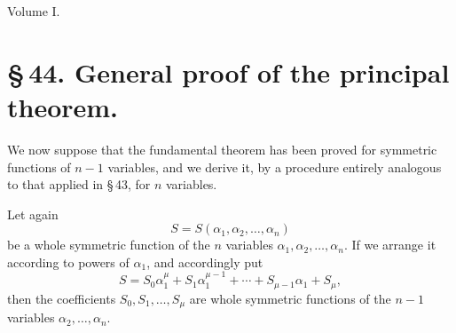 \documentclass[11pt]{article}
\begin{document}
\begin{center}{\large Volume I.}\end{center}

\section*{\S\,44. General proof of the principal theorem.}

We now suppose that the fundamental theorem has been proved for symmetric functions of \(n-1\) variables, and we derive it, by a procedure entirely analogous to that applied in \S\,43, for \(n\) variables.

Let again
\begin{equation}
 S=S(\alpha_1,\alpha_2,\ldots,\alpha_n)
\tag{1}
\end{equation}
be a whole symmetric function of the \(n\) variables \(\alpha_1,\alpha_2,\ldots,\alpha_n\). If we arrange it according to powers of \(\alpha_1\), and accordingly put
\begin{equation}
 S=S_0\alpha_1^\mu+S_1\alpha_1^{\mu-1}+\cdots+S_{\mu-1}\alpha_1+S_\mu,
\tag{2}
\end{equation}
then the coefficients \(S_0,S_1,\ldots,S_\mu\) are whole symmetric functions of the \(n-1\) variables \(\alpha_2,\ldots,\alpha_n\).
\end{document}
